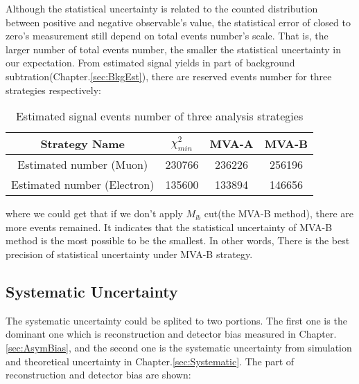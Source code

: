 		Although the statistical uncertainty is related to the counted distribution between positive and negative observable's value, the statistical error of closed to zero's measurement still depend on total events number's scale. That is, the larger number of total events number, the smaller the statistical uncertainty in our expectation. From estimated signal yields in part of background subtration(Chapter.\ref{sec:BkgEst}), there are reserved events number for three strategies respectively:

		\begin{center}
		\setlength{\tabcolsep}{12pt}
		\begin{longtable}{ | c | c c c | }
		\caption{Estimated signal events number of three analysis strategies} \\
		\hline
		Strategy Name & $\chi^2_{min}$ & MVA-A & MVA-B \\ 
		\hline
		Estimated number (Muon) & 230766 & 236226 & 256196 \\ 
		Estimated number (Electron) & 135600 & 133894 & 146656 \\
		\hline
		\end{longtable}
		\end{center}
		\FloatBarrier

		where we could get that if we don't apply $M_{lb}$ cut(the MVA-B method), there are more events remained. It indicates that the statistical uncertainty of MVA-B method is the most possible to be the smallest. In other words, There is the best precision of statistical uncertainty under MVA-B strategy.

	\subsection{Systematic Uncertainty}
	\label{ssec:Result_SystUnc}
		The systematic uncertainty could be splited to two portions. The first one is the dominant one which is reconstruction and detector bias measured in Chapter.\ref{sec:AsymBias}, and the second one is the systematic uncertainty from simulation and theoretical uncertainty in Chapter.\ref{sec:Systematic}. The part of reconstruction and detector bias are shown:

